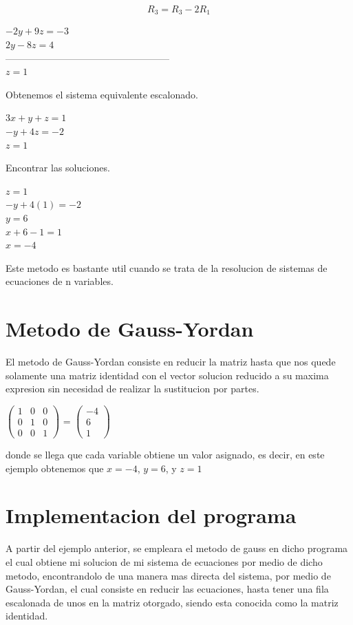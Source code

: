 \documentclass{article}
\begin{document}
\begin{multicols}{2}
\begin{equation}
R_{3}=R_{3}-2R_{1}
\end{equation}

\begin{center}
$- 2y + 9z = -3$
\\
$2y - 8z = 4$
\\
---------------------------------------------------
\\
$ z = 1$
\end{center}
Obtenemos el sistema equivalente escalonado.

\begin{center}
$3x+y+z=1$
\\
$-y + 4z= -2$
\\
$z=1$
\end{center}

Encontrar las soluciones.

 \begin{center}
$ z=1 $
\\
$-y + 4(1) = -2$
\\
$y = 6$
\\
$x + 6 - 1= 1$
\\
$x = -4$
 \end{center}
Este metodo es bastante util cuando se trata de la resolucion de sistemas de ecuaciones de n variables.

\section{Metodo de Gauss-Yordan}
\label{sec:Met}
El metodo de Gauss-Yordan consiste en reducir la matriz hasta que nos quede solamente una matriz identidad con el vector solucion reducido a su maxima expresion sin necesidad de realizar la sustitucion por partes.
\begin{center}
$\left( \begin{array}{ccc}
1 & 0 & 0 \\
0 & 1 & 0  \\
0 & 0 & 1  
\end{array} \right)
$
=
$\left( \begin{array}{c}
	-4 \\
	6 \\
	1 
\end{array} \right)
$
\end{center}
donde se llega que cada variable obtiene un valor asignado, es decir, en este ejemplo obtenemos que $x=-4$, $y=6$, y $z=1$
\section{Implementacion del programa}
\label{sec:Imp}
A partir del ejemplo anterior, se empleara el metodo de gauss en dicho programa el cual obtiene mi solucion de mi sistema de ecuaciones por medio de dicho metodo, encontrandolo de una manera mas directa del sistema, por medio de Gauss-Yordan, el cual consiste en reducir las ecuaciones, hasta tener una fila escalonada de unos en la matriz otorgado, siendo esta conocida como la matriz identidad.


\end{multicols}
\end{document}
